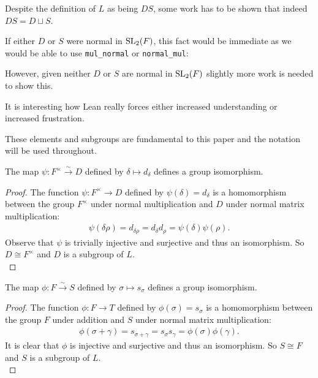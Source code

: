 \begin{remark}
    Despite the definition of $L$ as being $D S$, some work has to be shown that indeed $DS = D \sqcup S$.
    
    If either $D$ or $S$ were normal in $\operatorname{SL}_2(F)$, this fact would be immediate as we would be able to use \texttt{mul\_normal} or \texttt{normal\_mul}:
    
   
    

    However, given neither $D$ or $S$ are normal in $\operatorname{SL}_2(F)$ slightly more work is needed to show this.
    
    It is interesting how Lean really forces either increased understanding or increased frustration.
\end{remark}

These elements and subgroups are fundamental to this paper and the notation will be used throughout.

\begin{definition}
\label{SpecialSubgroups.D_iso_units}
\leanok
The map $\psi : F^\times \overset{\sim}{\rightarrow} D$ defined by $\delta \mapsto d_\delta$ defines a group isomorphism.
\end{definition}

\begin{proof}
    \leanok
    The function $\psi: F^\times \rightarrow D$ defined by $\psi(\delta) = d_\delta$ is a homomorphism between the group $F^\times$ under normal multiplication and $D$ under normal matrix multiplication:
\begin{align*} 
  \psi(\delta \rho) = d_{\delta \rho} =  d_\delta d_\rho = \psi(\delta) \psi(\rho). 
\end{align*}
Observe that $\psi$ is trivially injective and surjective and thus an isomorphism. So $D\cong F^\times$ and $D$ is a subgroup of $L$.\\
\end{proof}




\begin{definition}
\label{SpecialSubgroups.S_iso_F}
\leanok
    The map $\phi : F \overset{\sim}{\rightarrow} S$ defined by $\sigma \mapsto s_\sigma$ defines a group isomorphism.
\end{definition}

\begin{proof}
\leanok
     The function $\phi: F \rightarrow T$ defined by $\phi(\sigma) = s_\sigma$ is a homomorphism between the group $F$ under addition and $S$ under normal matrix multiplication:
\begin{align*} \phi(\sigma + \gamma) = s_{\sigma + \gamma} = s_\sigma s_\gamma = \phi(\sigma) \phi(\gamma).
\end{align*}
It is clear that $\phi$ is injective and surjective and thus an isomorphism. So $ S \cong F$ and $S$ is a subgroup of $L$. \\
\end{proof}


